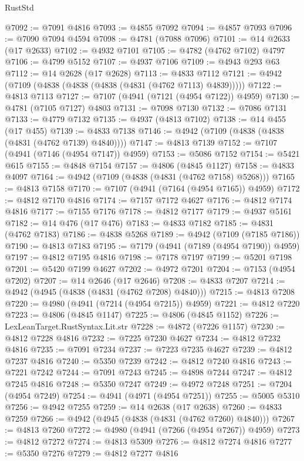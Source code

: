 \begin{lexlean}{RustStd}
\begin{coremodule}
@7092 := @7091 @4816
@7093 := @4855 @7092
@7094 := @4857 @7093
@7096 := @7090 @7094 @4594
@7098 := @4781 (@7088 @7096)
@7101 := @14 @2633 (@17 @2633)
@7102 := @4932 @7101
@7105 := @4782 (@4762 @7102) @4797
@7106 := @4799 @5152
@7107 := @4937 @7106
@7109 := @4943 @293 @63
@7112 := @14 @2628 (@17 @2628)
@7113 := @4833 @7112
@7121 := @4942 (@7109 (@4838 (@4838 (@4838 (@4831 (@4762 @7113) @4839)))))
@7122 := @4813 @7113
@7127 := @7107 (@4941 (@7121 (@4954 @7122)) @4959)
@7130 := @4781 (@7105 @7127) @4803
@7131 := @7098 @7130
@7132 := @7086 @7131
@7133 := @4779 @7132
@7135 := @4937 (@4813 @7102)
@7138 := @14 @455 (@17 @455)
@7139 := @4833 @7138
@7146 := @4942 (@7109 (@4838 (@4838 (@4831 (@4762 @7139) @4840))))
@7147 := @4813 @7139
@7152 := @7107 (@4941 (@7146 (@4954 @7147)) @4959)
@7153 := @5086 @7152
@7154 := @5421 @615
@7155 := @4848 @7154
@7157 := @4806 (@4845 @1127)
@7158 := @4833 @4097
@7164 := @4942 (@7109 (@4838 (@4831 (@4762 @7158) @5268)))
@7165 := @4813 @7158
@7170 := @7107 (@4941 (@7164 (@4954 @7165)) @4959)
@7172 := @4812 @7170 @4816
@7174 := @7157 @7172 @4627
@7176 := @4812 @7174 @4816
@7177 := @7155 @7176
@7178 := @4812 @7177
@7179 := @4937 @5161
@7182 := @14 @476 (@17 @476)
@7183 := @4833 @7182
@7185 := @4831 (@4762 @7183)
@7186 := @4838 @5268
@7189 := @4942 (@7109 (@7185 @7186))
@7190 := @4813 @7183
@7195 := @7179 (@4941 (@7189 (@4954 @7190)) @4959)
@7197 := @4812 @7195 @4816
@7198 := @7178 @7197
@7199 := @5201 @7198
@7201 := @5420 @7199 @4627
@7202 := @4972 @7201
@7204 := @7153 (@4954 @7202)
@7207 := @14 @2646 (@17 @2646)
@7208 := @4833 @7207
@7214 := @4942 (@4945 (@4838 (@4831 (@4762 @7208) @4840)))
@7215 := @4813 @7208
@7220 := @4980 (@4941 (@7214 (@4954 @7215)) @4959)
@7221 := @4812 @7220
@7223 := @4806 (@4845 @1147)
@7225 := @4806 (@4845 @1152)
@7226 := LexLeanTarget.RustSyntax.Lit.str
@7228 := @4872 (@7226 @1157)
@7230 := @4812 @7228 @4816
@7232 := @7225 @7230 @4627
@7234 := @4812 @7232 @4816
@7235 := @7091 @7234
@7237 := @7223 @7235 @4627
@7239 := @4812 @7237 @4816
@7240 := @5350 @7239
@7242 := @4812 @7240 @4816
@7243 := @7221 @7242
@7244 := @7091 @7243
@7245 := @4898 @7244
@7247 := @4812 @7245 @4816
@7248 := @5350 @7247
@7249 := @4972 @7248
@7251 := @7204 (@4954 @7249)
@7254 := @4941 (@4971 (@4954 @7251))
@7255 := @5005 @5310
@7256 := @4942 @7255
@7259 := @14 @2638 (@17 @2638)
@7260 := @4833 @7259
@7266 := @4942 (@4945 (@4838 (@4831 (@4762 @7260) @4840)))
@7267 := @4813 @7260
@7272 := @4980 (@4941 (@7266 (@4954 @7267)) @4959)
@7273 := @4812 @7272
@7274 := @4813 @5309
@7276 := @4812 @7274 @4816
@7277 := @5350 @7276
@7279 := @4812 @7277 @4816

\end{coremodule}
\end{lexlean}
